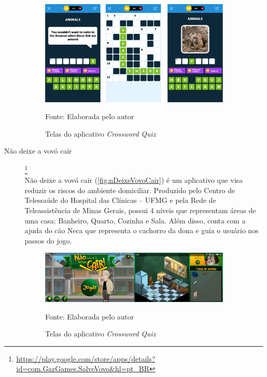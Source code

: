 \begin{description}
\begin{figure}[H]
\centering
    \caption{Telas do aplicativo \textit{Crossword Quiz}}
    \label{fig:crossQuiz}
    \includegraphics[width=0.9\textwidth]{Figuras/crosswordQuiz.jpg}
    
    Fonte: Elaborada pelo autor
\end{figure}


\item[Não deixe a vovó cair]\footnote{\url{https://play.google.com/store/apps/details?id=com.GazGames.SalveVovo&hl=pt_BR}} \hfill \\
Não deixe a vovó cair (\autoref{fig:nDeixeVovoCair}) é um aplicativo que visa reduzir os riscos do ambiente domiciliar. Produzido pelo Centro de Telessaúde do Hospital das Clínicas – UFMG e pela Rede de Teleassistência de Minas Gerais, possui 4 níveis que representam áreas de uma casa: Banheiro, Quarto, Cozinha e Sala. Além disso, conta com a ajuda do cão Neca que representa o cachorro da dona e guia o usuário nos passos do jogo.
\begin{figure}[H]
\centering
    \caption{Telas do aplicativo \textit{Crossword Quiz}}
    \label{fig:nDeixeVovoCair}
    \includegraphics[width=0.9\textwidth]{Figuras/nDeixeVovoCair.jpg}
    
    Fonte: Elaborada pelo autor
\end{figure}


\end{description}



